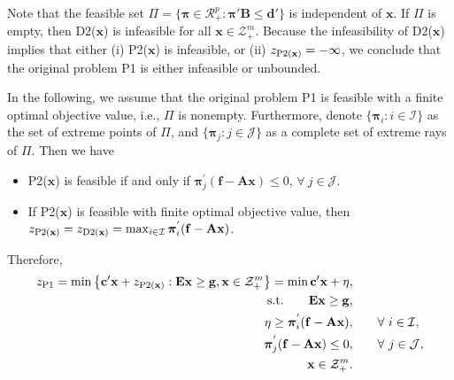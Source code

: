 \documentclass[UTF8]{article}
\newcommand{\vect}{\mathbf}
\newcommand{\set}{\mathcal}
\begin{document}
Note that the feasible set $\Pi = \{\bm{\pi} \in \set{R}_{+}^{p}: \bm{\pi}' \vect{B} \le \vect{d}'\}$ is independent of $\vect{x}$. If $\Pi$ is empty, then D2($\vect{x}$) is infeasible for all $\vect{x} \in \set{Z}_{+}^{m}$. Because the infeasibility of D2($\vect{x}$) implies that either (i) P2($\vect{x}$) is infeasible, or (ii) $z_{{\rm P2}(\vect{x})} = - \infty$, we conclude that the original problem P1 is either infeasible or unbounded.

In the following, we assume that the original problem P1 is feasible with a finite optimal objective value, i.e., $\Pi$ is nonempty. Furthermore, denote $\{\bm{\pi}_i: i \in \set{I}\}$ as the set of extreme points of $\Pi$, and $\{\bm{\pi}_j: j \in \set{J}\}$ as a complete set of extreme rays of $\Pi$. Then we have 
\begin{itemize}
	\item P2($\vect{x}$) is feasible if and only if $\bm{\pi}_{j}^{'} (\vect{f} - \vect{A} \vect{x}) \le 0$, $\forall~ j \in \set{J}$.
	\item If P2($\vect{x}$) is feasible with finite optimal objective value, then $z_{{\rm P2}(\vect{x})} = z_{{\rm D2}(\vect{x})} = \max_{i \in \set{I}} \bm{\pi}_{i}^{'} (\vect{f} - \vect{A} \vect{x})$.
\end{itemize}

Therefore, 
\begin{align}
	z_{\rm P1} = \min \left\{\vect{c}' \vect{x} + z_{{\rm P2}(\vect{x})}: \vect{E} \vect{x} \ge \vect{g}, \vect{x} \in \set{Z}_{+}^{m}\right\} = \min \vect{c}' \vect{x} + \eta, & \\
	\text{\rm s.t.} \qquad \vect{E} \vect{x} \ge \vect{g}, & \\
	\eta \ge \bm{\pi}_{i}^{'} (\vect{f} - \vect{A} \vect{x}), & \qquad \forall~ i \in \set{I}, \\
	\bm{\pi}_{j}^{'} (\vect{f} - \vect{A} \vect{x}) \le 0, & \qquad \forall~ j \in \set{J}, \\
	\vect{x} \in \set{Z}_{+}^{m}. & 
\end{align}





\end{document}
